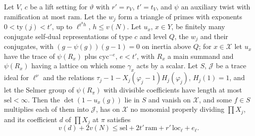 \begin{theorem}\label{thm:ribet-columns}
Let $V$, $c$ be a lift setting for $\vartheta$ with $r'=r_V$, $t'=t_V$, and $\psi$ an auxiliary twist with ramification at most $\mathrm{ram}$. Let the $w_j$ form a triangle of primes with exponents $0<\mathrm{ty}(j)<t'$, up to
$\ell^{\mathrm r^8h}$, $h\le v(N)$. Let $u_x$, $x\in Y$, be finitely many conjugate self-dual representations of type $c$ and level $Q$, the $w_j$ and their conjugates, with $(g-\psi(g))(g-1)=0$ on inertia above $Q$; for $x\in\mathcal X$ let
$u_x$ have the trace of $\psi(R_x)$ plus $\mathrm{cyc}^{-e}$, $e<t'$, with $R_x$ a main summand and $\psi(R_x)$ having a lattice on which some $\gamma_x$ acts by a scalar. Let $S$, $\mathcal J$ be a trace ideal for $\ell^\nu$ and the relations
$\tau_j-1-X_j(\varphi_j-1)H_j(\varphi_j)$, $H_j(1)=1$, and let the Selmer group of $\psi(R_\pi)$ with divisible coefficients have length at most $\mathrm{sel}<\infty$. Then the $\det(1-u_x(g))$ lie in $S$ and vanish on $\mathcal X$, and some $f\in S$
multiplies each of them into $\mathcal J$, has on $\mathcal X$ no monomial properly dividing $\prod X_j$, and its coefficient $d$ of $\prod X_j$ at $\pi$ satisfies
\[
  v(d)+2v(N)\le\mathrm{sel}+2t'\,\mathrm{ram}+r'\,\mathrm{loc}_\ell+e_\ell.
\]
\end{theorem}

